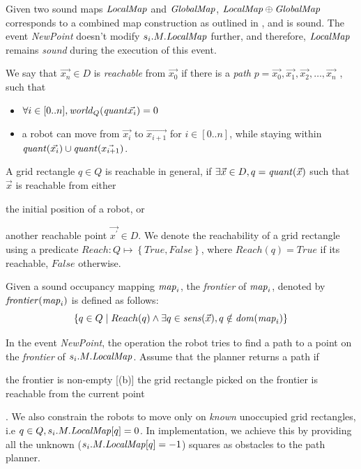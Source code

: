 Given two sound maps $\mathit{LocalMap}$ and $\mathit{GlobalMap}$, $\mathit{LocalMap} \oplus \mathit{GlobalMap}$ corresponds to a combined map construction as outlined in , and is sound. The event \emph{NewPoint} doesn't modify $s_i.M.\mathit{LocalMap}$ further, and therefore, $\mathit{LocalMap}$ remains \emph{sound} during the execution of this event.

\begin{definition}
 We say that $\Vec{x_n}\in D$ is \emph{reachable} from $\Vec{x_0}$ if there is a \emph{path} $p = \Vec{x_0},\Vec{x_1}, \Vec{x_2},\ldots, \Vec{x_n}$ , such that
\begin{itemize}
\item $\forall i \in [0..n],\mathit{world}_Q(\mathit{quant}{\Vec{x_i}}) = 0$
\item a robot can move from $\Vec{x_i}$ to $\Vec{x_{i+1}}$ for $i \in [0..n]$, while staying within $\mathit{quant}(\Vec{x_i}) \cup \mathit{quant}(\Vec{x_{i+1}})$.
\end{itemize}
\end{definition}

A grid rectangle $q\in Q$ is reachable in general, if $\exists \Vec{x}\in D, q = \mathit{quant}(\Vec{x})$ such that $\Vec{x}$ is reachable from either \begin{inparaenum} [(a)]\item the initial position of a robot, or \item another reachable point $\Vec{x^\prime}\in D$. We denote the reachability of a grid rectangle using a predicate $\mathit{Reach} : Q \mapsto \left\{\mathit{True}, \mathit{False}\right\}$, where $\mathit{Reach}(q) = \mathit{True}$ if its reachable,  $\mathit{False}$ otherwise.
\end{inparaenum}

\begin{definition}
    Given a sound occupancy mapping $\mathit{map}_i$, the \emph{frontier} of $\mathit{map}_i$, denoted by $\mathit{frontier}(\mathit{map}_i)$ is defined as follows:
    $$ \left\{ q\in Q \mid Reach(q) \wedge \exists q \in \mathit{sens}(\Vec{x}), q \notin \mathit{dom}(\mathit{map}_i)\right\} $$
\end{definition}

In the event \emph{NewPoint}, the operation the robot tries to find a path to a point on the \emph{frontier} of $s_i.M.\mathit{LocalMap}$. Assume that the planner returns a path if \begin{inparaenum}[(a)]\item the frontier is non-empty [(b)] the grid rectangle picked on the frontier is reachable from the current point \end{inparaenum}. We also constrain the robots to move only on \emph{known} unoccupied grid rectangles, i.e $q\in Q, s_i.M.\mathit{LocalMap}[q] = 0$. In implementation, we achieve this by providing all the unknown ($s_i.M.\mathit{LocalMap}[q] = -1$) squares as obstacles to the path planner.

